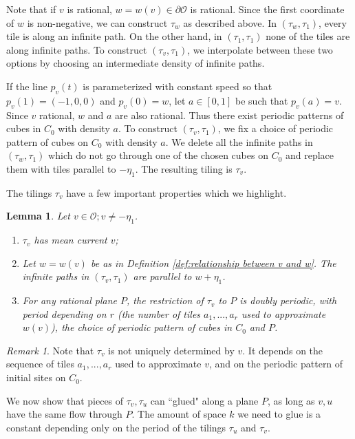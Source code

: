 \documentclass[11pt]{article}
\newtheorem{lemma}[thm]{Lemma}
\theoremstyle{remark}
\newtheorem{rem}[thm]{Remark}
\theoremstyle{definition}
\newcommand{\mc}[1]{\mathcal{#1}}
\begin{document}
Note that if $v$ is rational, $w=w(v)\in \partial \mc O$ is rational. Since the first coordinate of $w$ is non-negative, we can construct $\tau_w$ as described above. In $(\tau_w,\tau_1)$, every tile is along an infinite path. On the other hand, in $(\tau_1,\tau_1)$ none of the tiles are along infinite paths. To construct $(\tau_v,\tau_1)$, we interpolate between these two options by choosing an intermediate density of infinite paths.

If the line $p_v(t)$ is parameterized with constant speed so that $p_v(1) = (-1,0,0)$ and $p_v(0) = w$, let $a\in[0,1]$ be such that $p_v(a) = v$. Since $v$ rational, $w$ and $a$ are also rational. Thus there exist periodic patterns of cubes in $C_0$ with density $a$. To construct $(\tau_v,\tau_1)$, we fix a choice of periodic pattern of cubes on $C_0$ with density $a$. We delete all the infinite paths in $(\tau_w,\tau_1)$ which do not go through one of the chosen cubes on $C_0$ and replace them with tiles parallel to $-\eta_1$. The resulting tiling is $\tau_v$.

The tilings $\tau_v$ have a few important properties which we highlight. 
\begin{lemma}\label{lem:tau_v_props}
   Let $v\in \mathcal O; v\neq -\eta_1$. \begin{enumerate}
        \item $\tau_v$ has mean current $v$;
        \item Let $w = w(v)$ be as in Definition \ref{def:relationship between v and w}. The infinite paths in $(\tau_v,\tau_1)$ are parallel to $w+\eta_1$.
        \item For any rational plane $P$, the restriction of $\tau_v$ to $P$ is doubly periodic, with period depending on $r$ (the number of tiles $a_1,...,a_r$ used to approximate $w(v)$), the choice of periodic pattern of cubes in $C_0$ and $P$. 
    \end{enumerate}
\end{lemma}

\begin{rem}
Note that $\tau_v$ is not uniquely determined by $v$. It depends on the sequence of tiles $a_1,...,a_r$ used to approximate ${v}$, and on the periodic pattern of initial sites on $C_0$. 
\end{rem}


We now show that pieces of $\tau_v,\tau_u$ can ``glued" along a plane $P$, as long as $ v, u$ have the same flow through $P$. The amount of space $k$ we need to glue is a constant depending only on 
the period of the tilings $\tau_u$ and $\tau_v$.
\end{document}
